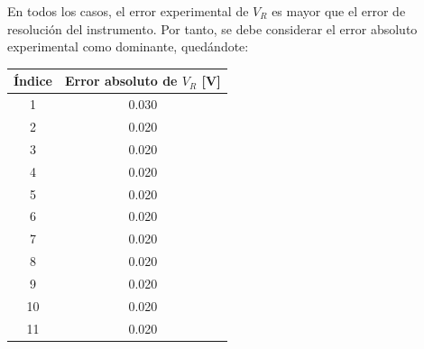 \documentclass{article}
\begin{document}
En todos los casos, el error experimental de $V_R$ es mayor que el error de resolución del instrumento. Por tanto, se debe considerar el error absoluto experimental como dominante, quedándote:
\begin{table}[H]
	\centering
	\begin{tabular}{|c|c|}
		\hline
		\textbf{Índice} & \textbf{Error absoluto de $V_R$ [V]} \\
		\hline
		1  & 0.030 \\
		2  & 0.020 \\
		3  & 0.020 \\
		4  & 0.020 \\
		5  & 0.020 \\
		6  & 0.020 \\
		7  & 0.020 \\
		8  & 0.020 \\
		9  & 0.020 \\
		10 & 0.020 \\
		11 & 0.020 \\
		\hline
	\end{tabular}
\end{table}
\end{document}
